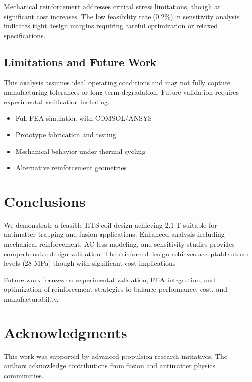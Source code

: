 \documentclass[10pt,twocolumn]{article}
\begin{document}
Mechanical reinforcement addresses critical stress limitations, though at significant cost increases. The low feasibility rate (0.2\%) in sensitivity analysis indicates tight design margins requiring careful optimization or relaxed specifications.

\subsection{Limitations and Future Work}

This analysis assumes ideal operating conditions and may not fully capture manufacturing tolerances or long-term degradation. Future validation requires experimental verification including:
\begin{itemize}
\item Full FEA simulation with COMSOL/ANSYS
\item Prototype fabrication and testing
\item Mechanical behavior under thermal cycling
\item Alternative reinforcement geometries
\end{itemize}

\section{Conclusions}

We demonstrate a feasible HTS coil design achieving 2.1 T suitable for antimatter trapping and fusion applications. Enhanced analysis including mechanical reinforcement, AC loss modeling, and sensitivity studies provides comprehensive design validation. The reinforced design achieves acceptable stress levels (28 MPa) though with significant cost implications.

Future work focuses on experimental validation, FEA integration, and optimization of reinforcement strategies to balance performance, cost, and manufacturability.

\section{Acknowledgments}

This work was supported by advanced propulsion research initiatives. The authors acknowledge contributions from fusion and antimatter physics communities.
\end{document}
